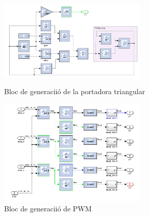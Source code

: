 {{        \begin{figure}[!htb]
            \centering
            \begin{minipage}[c]{7cm}
                \centering
                \captionsetup{justification=centering}
                \includegraphics[width=7cm]
                    { img/4_implementacio/triangular.png }
                \caption{ Bloc de generaciió de la portadora triangular }                
            \end{minipage} \hfil
            \begin{minipage}[c]{7cm}
                \centering
                \captionsetup{justification=centering}
                \includegraphics[width=7cm]
                    { img/4_implementacio/pwm.png }
                \caption{ Bloc de generaciió de PWM }                
            \end{minipage} \hfil
        \end{figure} 
    }
}

